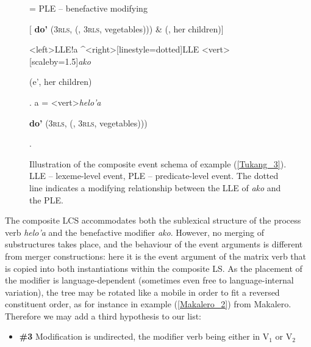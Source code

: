 \begin{figure}
\jtree[xunit=9.5em,yunit=2em]
\! = {PLE -- benefactive modifying}{\begin{scriptsize} $[$ \textbf{do'} (3\textsc{rls}, \textbf{} (, 3\textsc{rls}, vegetables))) \& (, her children)$]$\end{scriptsize}}
<left>{LLE}!a ^<right>[linestyle=dotted]{LLE}
<vert>[scaleby=1.5]{\textit{ako}}{\begin{scriptsize}  (e', her children)\end{scriptsize}}.
\!a = <vert>{\textit{helo'a}}
{\begin{scriptsize} \textbf{do'} (3\textsc{rls}, \textbf{} (, 3\textsc{rls}, vegetables)))\end{scriptsize}}.
\endjtree

\caption[Event schema illustration of example (\ref{Tukang_3})]{Illustration of the composite event schema of example (\ref{Tukang_3}). LLE -- lexeme-level event, PLE -- predicate-level event. The dotted line indicates a modifying relationship between the LLE of \textit{ako} and the PLE.}
\label{figure:eventschema_Maybrat97b}
\end{figure}

The composite LCS accommodates both the sublexical structure of the process verb \textit{helo'a} and the benefactive modifier \textit{ako}. However, no merging of substructures takes place, and the behaviour of the event arguments is different from merger constructions: here it is the event argument of the matrix verb that is copied into both instantiations within the composite LS. As the placement of the modifier is language-dependent (sometimes even free to language-internal variation), the tree may be rotated like a mobile in order to fit a reversed constituent order, as for instance in example (\ref{Makalero_2}) from Makalero. Therefore we may add a third hypothesis to our list:

\begin{itemize}
\item \textbf{\#3} Modification is undirected, the modifier verb being either in V$_1$ or V$_2$
\end{itemize}

